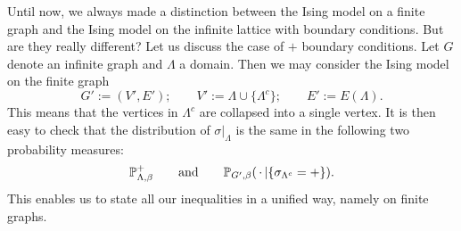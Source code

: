 \begin{remark}
    Until now, we always made a distinction between the Ising model on a finite graph
    and the Ising model on the infinite lattice with boundary conditions.
    But are they really different?
    Let us discuss the case of $+$ boundary conditions.
    Let $G$ denote an infinite graph and $\Lambda$ a domain.
    Then we may consider the Ising model on the finite graph
    \[
        G':=(V',E');
        \qquad
        V':=\Lambda\cup \{\Lambda^c\};
        \qquad
        E':=E(\Lambda).
    \]
    This means that the vertices in $\Lambda^c$ are collapsed
    into a single vertex.
    It is then easy to check that
    the distribution of $\sigma|_{\Lambda}$ is the same in the following two probability measures:
    \[
        \P^+_{\Lambda,\beta}
        \qquad
        \text{and}
        \qquad
        \P_{G',\beta}(\blank|\{\sigma_{\Lambda^c}=+\}).
    \]
    This enables us to state all our inequalities in a unified way,
    namely on finite graphs.
\end{remark}
